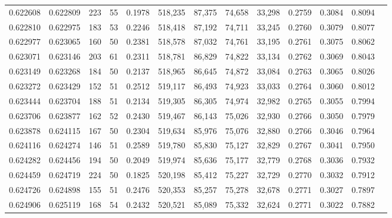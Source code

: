 \begin{tabular}{rrrrrrrrrrrrr}
0.622608 & 0.622809 &   223 &  55 &                                     0.1978 & 518,235 &  87,375 &  74,658 &  33,298 & 0.2759 & 0.3084 & 0.8094 \\
0.622810 & 0.622975 &   183 &  53 &                                     0.2246 & 518,418 &  87,192 &  74,711 &  33,245 & 0.2760 & 0.3079 & 0.8077 \\
0.622977 & 0.623065 &   160 &  50 &                                     0.2381 & 518,578 &  87,032 &  74,761 &  33,195 & 0.2761 & 0.3075 & 0.8062 \\
0.623071 & 0.623146 &   203 &  61 &                                     0.2311 & 518,781 &  86,829 &  74,822 &  33,134 & 0.2762 & 0.3069 & 0.8043 \\
0.623149 & 0.623268 &   184 &  50 &                                     0.2137 & 518,965 &  86,645 &  74,872 &  33,084 & 0.2763 & 0.3065 & 0.8026 \\
0.623272 & 0.623429 &   152 &  51 &                                     0.2512 & 519,117 &  86,493 &  74,923 &  33,033 & 0.2764 & 0.3060 & 0.8012 \\
0.623444 & 0.623704 &   188 &  51 &                                     0.2134 & 519,305 &  86,305 &  74,974 &  32,982 & 0.2765 & 0.3055 & 0.7994 \\
0.623706 & 0.623877 &   162 &  52 &                                     0.2430 & 519,467 &  86,143 &  75,026 &  32,930 & 0.2766 & 0.3050 & 0.7979 \\
0.623878 & 0.624115 &   167 &  50 &                                     0.2304 & 519,634 &  85,976 &  75,076 &  32,880 & 0.2766 & 0.3046 & 0.7964 \\
0.624116 & 0.624274 &   146 &  51 &                                     0.2589 & 519,780 &  85,830 &  75,127 &  32,829 & 0.2767 & 0.3041 & 0.7950 \\
0.624282 & 0.624456 &   194 &  50 &                                     0.2049 & 519,974 &  85,636 &  75,177 &  32,779 & 0.2768 & 0.3036 & 0.7932 \\
0.624459 & 0.624719 &   224 &  50 &                                     0.1825 & 520,198 &  85,412 &  75,227 &  32,729 & 0.2770 & 0.3032 & 0.7912 \\
0.624726 & 0.624898 &   155 &  51 &                                     0.2476 & 520,353 &  85,257 &  75,278 &  32,678 & 0.2771 & 0.3027 & 0.7897 \\
0.624906 & 0.625119 &   168 &  54 &                                     0.2432 & 520,521 &  85,089 &  75,332 &  32,624 & 0.2771 & 0.3022 & 0.7882 \\

\end{tabular}
